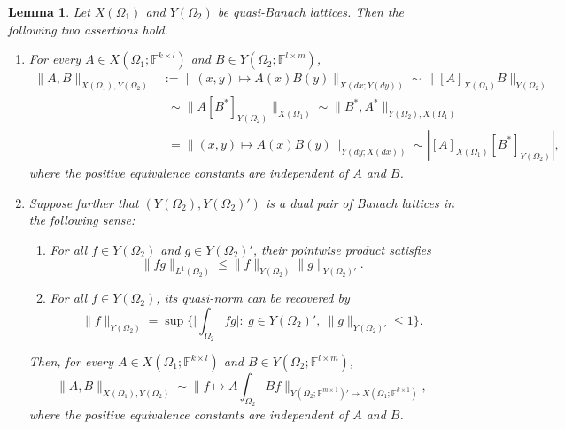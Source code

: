 \documentclass[11pt, reqno]{amsart}
\newtheorem{lemma}[theorem]{Lemma}
\theoremstyle{definition}
\theoremstyle{remark}
\numberwithin{equation}{section}
\newcommand{\F}{\mathbb F}
\newcommand{\Babs}[1]{\Big|#1\Big|}
\newcommand{\Norm}[2]{\|#1\|_{#2}}
\begin{document}
\begin{lemma}\label{red Fub}
Let $X(\Omega_1)$ and $Y(\Omega_2)$ be quasi-Banach lattices.
Then the following two assertions hold.
\begin{enumerate}[\rm(i)]
\item\label{it:Fub-basic} For every $A\in X(\Omega_1;\F^{k\times l})$ and $B\in Y(\Omega_2;\F^{l\times m})$,
\begin{align*}
\Norm{A,B}{X(\Omega_1),Y(\Omega_2)}
&:=\|(x,y)\mapsto A(x)B(y)\|_{X(dx;Y(dy))}
\sim \Norm{[A]_{X(\Omega_1)} B}{Y(\Omega_2)} \\
&\phantom{:}\sim \Norm{A[B^*]_{Y(\Omega_2)}}{X(\Omega_1)}
\sim\Norm{B^*,A^*}{Y(\Omega_2),X(\Omega_1)}\\
&\phantom{:}=\|(x,y)\mapsto A(x)B(y)\|_{Y(dy;X(dx))}
\sim|[A]_{X(\Omega_1)}[B^*]_{Y(\Omega_2)}|,
\end{align*}
where the positive equivalence constants are independent of $A$ and $B$.

\item\label{it:Fub-dual} Suppose further that
$(Y(\Omega_2),Y(\Omega_2)')$ is a
\emph{dual pair} of Banach lattices in the following sense:
\begin{enumerate}[\rm(a)]
\item For all $f\in Y(\Omega_2)$ and $g\in Y(\Omega_2)'$, their pointwise product satisfies
\begin{equation}\label{bhi}
\|fg\|_{L^1(\Omega_2)}\leq\Norm{f}{Y(\Omega_2)}\Norm{g}{Y(\Omega_2)'}.
\end{equation}

\item For all $f\in Y(\Omega_2)$, its quasi-norm can be recovered by
\begin{equation}\label{129}
\Norm{f}{Y(\Omega_2)}=\sup\bigg\{\Babs{\int_{\Omega_2}fg}:\
g\in Y(\Omega_2)',\ \Norm{g}{Y(\Omega_2)'}\leq 1\bigg\}.
\end{equation}
\end{enumerate}
Then, for every $A\in X(\Omega_1;\F^{k\times l})$ and $B\in Y(\Omega_2;\F^{l\times m})$,
\begin{equation*}
\Norm{A,B}{X(\Omega_1),Y(\Omega_2)}
\sim\Big\|f\mapsto A\int_{\Omega_2}B f\Big\|_{Y(\Omega_2;\mathbb F^{m\times 1})'\to X(\Omega_1;\mathbb F^{k\times 1})},
\end{equation*}
where the positive equivalence constants are independent of $A$ and $B$.
\end{enumerate}
\end{lemma}
\end{document}
